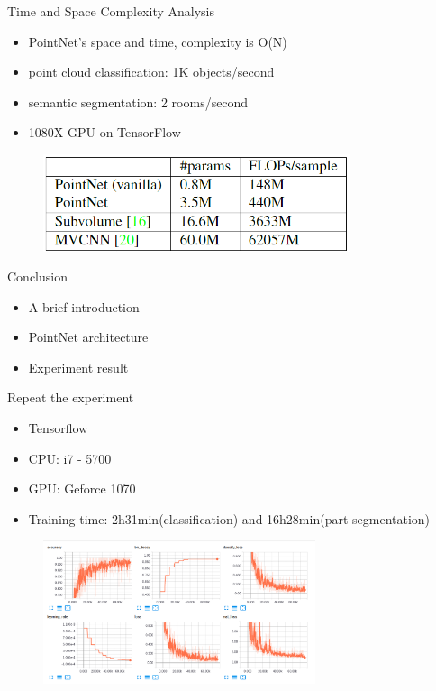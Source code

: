 \documentclass[serif,mathserif]{beamer}
\begin{document}
\begin{frame}{Time and Space Complexity Analysis}
	\begin{itemize}
		\item PointNet’s space and time, complexity is O(N)
		\item point cloud classification: 1K objects/second
		\item semantic segmentation: 2 rooms/second
		\item 1080X GPU on TensorFlow
	\end{itemize}
	\begin{figure}
		\includegraphics[width=9cm]{image/time.png}
	\end{figure}
\end{frame}

\begin{frame}{Conclusion}
	\begin{itemize}
		\item A brief introduction
		\item PointNet architecture
		\item Experiment result
	\end{itemize}
\end{frame}

\begin{frame}{Repeat the experiment}
	\begin{itemize}
		\item Tensorflow
		\item CPU: i7 - 5700
		\item GPU: Geforce 1070
		\item Training time: 2h31min(classification) and 16h28min(part segmentation)
	\end{itemize}
	\begin{figure}
		\includegraphics[width=8cm]{image/classify_log.png}
	\end{figure}
\end{frame}
\end{document}
